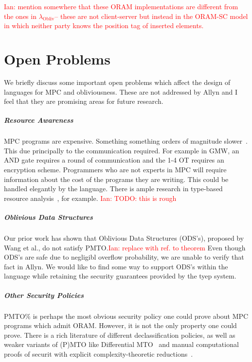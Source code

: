 \documentclass{report}
\newcommand{\lang}{Allyn\xspace}
\newcommand{\obliv}{\ensuremath{\lambda_{\mathrm{Obliv}}}\xspace}
\newcommand{\ins}[1]{\textcolor{red}{Ian: #1}}
\begin{document}
\ins{mention somewhere that these ORAM implementations are different from the ones in \obliv -- these are not client-server but instead in
  the ORAM-SC model in which neither party knows the position tag of inserted elements.}

\chapter{Open Problems}

We briefly discuss some important open problems which affect the design of languages for
MPC and obliviousness. These are not addressed by \lang and I feel that they are promising
areas for future research.

\paragraph{Resource Awareness}
MPC programs are expensive. Something something orders of magnitude slower~\cite{}. This due principally to the communication
required. For example in GMW, an AND gate requires a round of communication and the 1-4 OT requires an encryption scheme.
Programmers who are not experts in MPC will require information about the cost of the programs they are writing. This could be
handled elegantly by the language. There is ample research in type-based resource analysis~\cite{}, for example. \ins{TODO: this is rough}

\paragraph{Oblivious Data Structures}
Our prior work has shown that Oblivious Data Structures (ODS's), proposed by Wang et al., do not satisfy PMTO.\ins{replace with ref. to theorem} Even though ODS's are safe due to negligibl overflow probability, we are unable to verify that fact in \lang. We would like to find some
way to support ODS's within the language while retaining the security guarantees provided by the tyep system.

\paragraph{Other Security Policies}
PMTO\% is perhaps the most obvious security policy one could prove about MPC programs which admit ORAM. However, it is not the only property
one could prove. There is a rich literature of different declassification policies, as well as weaker variants of (P)MTO like Differential
MTO~\cite{} and manual computational proofs of securit with explicit complexity-theoretic reductions~\cite{easycrypt}.
\end{document}
